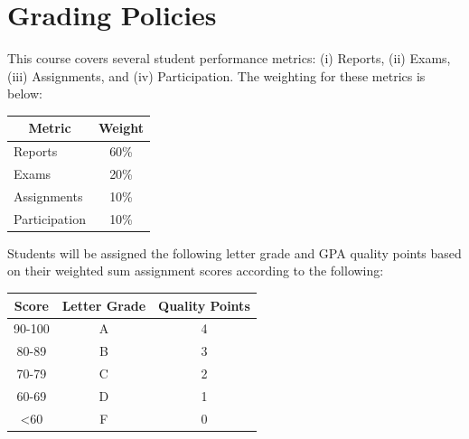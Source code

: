\documentclass[
	letterpaper, %
	fontsize=10pt, %
	twoside=true, %
	numbers=noenddot, %
]{kaobook}
\begin{document}
\section*{Grading Policies} 
This course covers several student performance metrics: (i) Reports, (ii) Exams, (iii) Assignments, and (iv) Participation. The weighting for these metrics is below:

\begin{table}[ht!]
    \begin{tabular}{l | c}
        \toprule
        \multicolumn{1}{c|}{\textbf{Metric}} & \textbf{Weight} \\
        \midrule
        Reports         & 60\% \\
        Exams           & 20\% \\
        Assignments     & 10\% \\
        Participation   & 10\% \\
        \bottomrule
    \end{tabular}
\end{table}

Students will be assigned the following letter grade and GPA quality points based on their weighted sum assignment scores according to the following:

\begin{table}[h!]
    \begin{tabular}{c | c | c}
        \toprule
        \textbf{Score} & \textbf{Letter Grade} & \textbf{Quality Points} \\
        \midrule
        90-100              & A     & 4 \\
        80-89               & B     & 3 \\
        70-79               & C     & 2 \\
        60-69\footnotemark  & D     & 1 \\
        <60                 & F     & 0 \\
        \bottomrule
    \end{tabular}
\end{table}

\pagebreak
\end{document}
